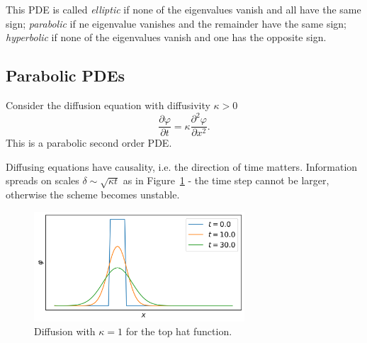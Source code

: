 \documentclass[11pt, a4paper]{article}
\renewcommand{\phi}{\varphi}
\theoremstyle{break}
\newcommand{\der}[2]{\frac{\partial #1}{\partial #2}}
\newcommand{\pder}[3][2]{\frac{\partial^#1 #2}{\partial #3^#1}}
\begin{document}
This PDE is called \emph{elliptic} if none of the eigenvalues vanish and all have the same sign; \emph{parabolic} if ne eigenvalue vanishes and the remainder have the same sign; \emph{hyperbolic} if none of the eigenvalues vanish and one has the opposite sign.

\subsection{Parabolic PDEs}

Consider the diffusion equation with diffusivity $\kappa>0$ \[\der\phi t=\kappa\pder\phi x.\] This is a parabolic second order PDE. 

Diffusing equations have causality, i.e. the direction of time matters. Information spreads on scales $\delta\sim\sqrt{\kappa t}$ as in Figure~\ref{fig:diffusionTopHat} - the time step cannot be larger, otherwise the scheme becomes unstable.

\begin{figure}
	\centering
	\includegraphics[width=0.7\textwidth]{diffusionSpreading2}
	\caption{Diffusion with $\kappa=1$ for the top hat function.}
	\label{fig:diffusionTopHat}
\end{figure}
\end{document}

